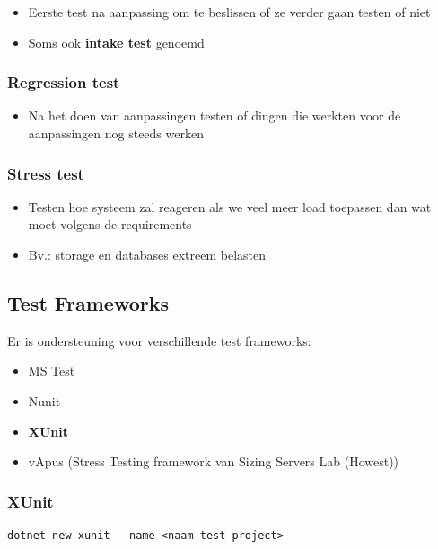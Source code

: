 \documentclass{article}
\begin{document}
\begin{itemize}
    \item Eerste test na aanpassing om te beslissen of ze verder gaan testen of niet
    \item Soms ook \textbf{intake test} genoemd
\end{itemize}

\subsubsection{Regression test}

\begin{itemize}
    \item Na het doen van aanpassingen testen of dingen die werkten voor de aanpassingen nog steeds werken
\end{itemize}

\subsubsection{Stress test}

\begin{itemize}
    \item Testen hoe systeem zal reageren als we veel meer load toepassen dan wat moet volgens de requirements
    \item Bv.: storage en databases extreem belasten
\end{itemize}

\subsection{Test Frameworks}

Er is ondersteuning voor verschillende test frameworks:

\begin{itemize}
    \item MS Test
    \item Nunit
    \item \textbf{XUnit}
    \item vApus (Stress Testing framework van Sizing Servers Lab (Howest))
\end{itemize}

\subsubsection{XUnit}

\begin{verbatim}
dotnet new xunit --name <naam-test-project>
\end{verbatim}
\end{document}
